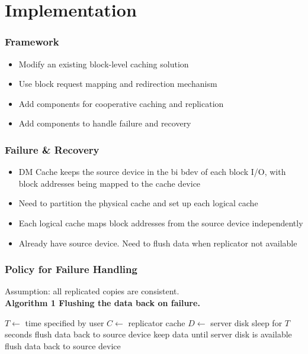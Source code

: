 \section{Implementation}
%
\begin{frame}
    \frametitle{Framework}
    \begin{itemize}
	\item Modify an existing block-level caching solution
	\item Use block request mapping and redirection mechanism
	\item Add components for cooperative caching and replication
	\item Add components to handle failure and recovery
    \end{itemize}
\end{frame}
\begin{frame}
    \frametitle{Failure \& Recovery}
    \begin{itemize}
	\item DM Cache keeps the source device in the bi bdev
	    of each block I/O, with block addresses being mapped
	    to the cache device
	\item Need to partition the physical cache and set up
	    each logical cache
	\item Each logical cache maps block addresses from the
	    source device independently
	\item Already have source device. Need to flush data when
	    replicator not available
    \end{itemize}
\end{frame}
\begin{frame}
    \frametitle{Policy for Failure Handling}
    Assumption: all replicated copies are consistent. \\
    \bf Algorithm 1 \rm Flushing the data back on failure. \\
    \begin{algorithmic}[1]
	    \State $T\gets$ time specified by user
	    \State $C\gets$ replicator cache
	    \State $D\gets$ server disk
		    sleep for $T$ seconds
		\Else
			\State flush data back to source device
		    \Else {}
			\State keep data until server disk is available
			\State flush data back to source device
		    \EndIf
		\EndIf
	    \EndWhile
	\EndProcedure
    \end{algorithmic}   
\end{frame}
